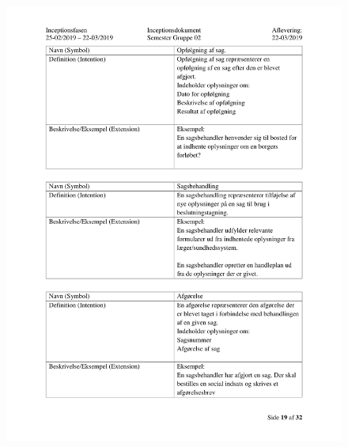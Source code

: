 \begin{figure}[hb]
  \includegraphics[scale = 0.33]{./PNG/Inceptions/Gruppe02+InceptionsDokument-20.jpg} 
\end{figure}

